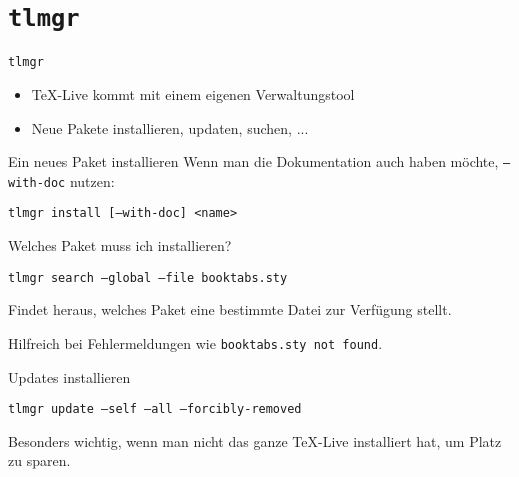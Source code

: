\section{\texttt{tlmgr}}

\begin{frame}[fragile]{
  \texttt{tlmgr}
}
  \begin{itemize}
    \item \TeX-Live kommt mit einem eigenen Verwaltungstool
    \item Neue Pakete installieren, updaten, suchen, ...
  \end{itemize}

  \begin{block}{Ein neues Paket installieren}
    Wenn man die Dokumentation auch haben möchte, \texttt{--with-doc} nutzen:
    \begin{center}
      \texttt{tlmgr install [--with-doc] <name>}
    \end{center}
  \end{block}

  \begin{block}{Welches Paket muss ich installieren?}

    \begin{center}
      \texttt{tlmgr search --global --file booktabs.sty}
    \end{center}
    Findet heraus, welches Paket eine bestimmte Datei zur Verfügung stellt.

    Hilfreich bei Fehlermeldungen wie \texttt{booktabs.sty not found}.
  \end{block}

  \begin{block}{Updates installieren}
    \begin{center}
      \texttt{tlmgr update --self --all --forcibly-removed}
    \end{center}
  \end{block}

  Besonders wichtig, wenn man nicht das ganze TeX-Live installiert hat,
  um Platz zu sparen.
\end{frame}
